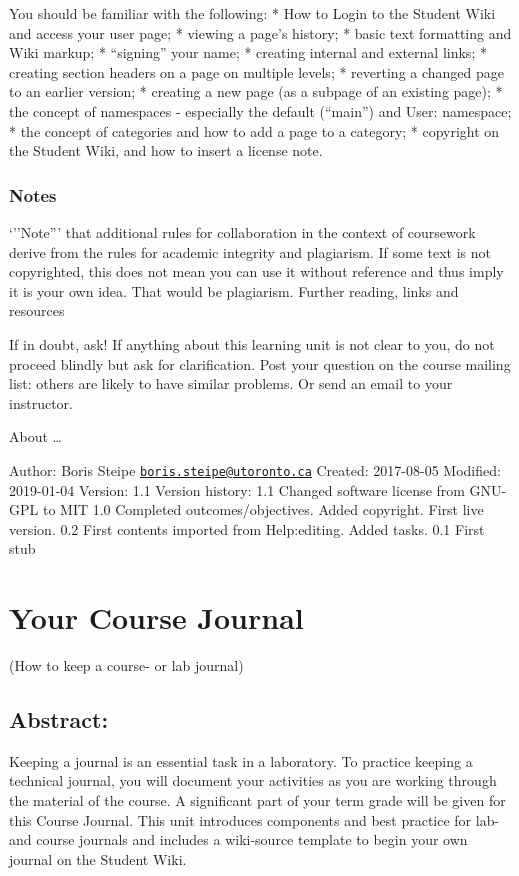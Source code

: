 \documentclass[]{book}
\begin{document}
You should be familiar with the following: * How to Login to the Student
Wiki and access your user page; * viewing a page's history; * basic text
formatting and Wiki markup; * ``signing'' your name; * creating internal
and external links; * creating section headers on a page on multiple
levels; * reverting a changed page to an earlier version; * creating a
new page (as a subpage of an existing page); * the concept of namespaces
- especially the default (``main'') and User: namespace; * the concept
of categories and how to add a page to a category; * copyright on the
Student Wiki, and how to insert a license note.

\subsection{Notes}\label{notes}

`''Note''' that additional rules for collaboration in the context of
coursework derive from the rules for academic integrity and plagiarism.
If some text is not copyrighted, this does not mean you can use it
without reference and thus imply it is your own idea. That would be
plagiarism. Further reading, links and resources

If in doubt, ask! If anything about this learning unit is not clear to
you, do not proceed blindly but ask for clarification. Post your
question on the course mailing list: others are likely to have similar
problems. Or send an email to your instructor.

About \ldots{}

Author: Boris Steipe
\href{mailto:boris.steipe@utoronto.ca}{\nolinkurl{boris.steipe@utoronto.ca}}
Created: 2017-08-05 Modified: 2019-01-04 Version: 1.1 Version history:
1.1 Changed software license from GNU-GPL to MIT 1.0 Completed
outcomes/objectives. Added copyright. First live version. 0.2 First
contents imported from Help:editing. Added tasks. 0.1 First stub

\chapter{Your Course Journal}\label{journal}

(How to keep a course- or lab journal)

\section{Abstract:}\label{abstract-1}

Keeping a journal is an essential task in a laboratory. To practice
keeping a technical journal, you will document your activities as you
are working through the material of the course. A significant part of
your term grade will be given for this Course Journal. This unit
introduces components and best practice for lab- and course journals and
includes a wiki-source template to begin your own journal on the Student
Wiki.
\end{document}
